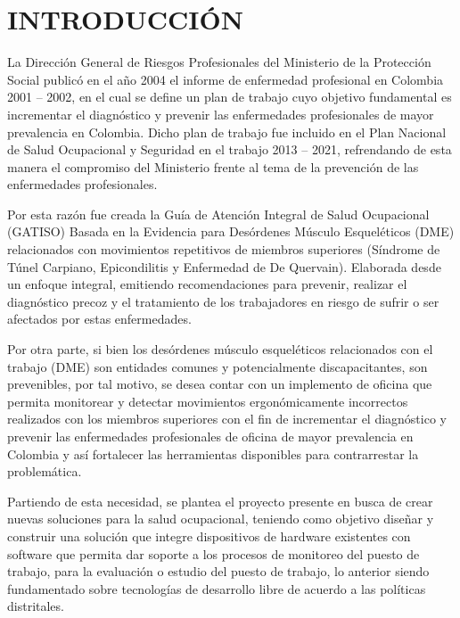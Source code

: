 \newpage
\chapter{INTRODUCCIÓN} 
La Dirección General de Riesgos Profesionales del Ministerio de la Protección Social publicó en el año 2004 el informe de enfermedad profesional en Colombia 2001 – 2002, en el cual se define un plan de trabajo cuyo objetivo fundamental es incrementar el diagnóstico y prevenir las enfermedades profesionales de mayor prevalencia en Colombia. Dicho plan de trabajo fue incluido en el Plan Nacional de Salud Ocupacional y Seguridad en el trabajo 2013 – 2021, refrendando de esta manera el compromiso del Ministerio frente al tema de la prevención de las enfermedades profesionales.

Por esta razón fue creada la Guía de Atención Integral de Salud Ocupacional (GATISO) Basada en la Evidencia para Desórdenes Músculo Esqueléticos (DME) relacionados con movimientos repetitivos de miembros superiores (Síndrome de Túnel Carpiano, Epicondilitis y Enfermedad de De Quervain). Elaborada desde un enfoque integral, emitiendo recomendaciones para prevenir, realizar el diagnóstico precoz y el tratamiento de los trabajadores en riesgo de sufrir o ser afectados por estas enfermedades.

Por otra parte, si bien los desórdenes músculo esqueléticos relacionados con el trabajo (DME) son entidades comunes y potencialmente discapacitantes, son prevenibles, por tal motivo, se desea contar con un implemento de oficina que permita monitorear y detectar movimientos ergonómicamente incorrectos realizados con los miembros superiores con el fin de incrementar el diagnóstico y prevenir las enfermedades profesionales de oficina de mayor prevalencia en Colombia y así fortalecer las herramientas disponibles para contrarrestar la problemática.

Partiendo de esta necesidad, se plantea el proyecto presente en busca de crear nuevas soluciones para la salud ocupacional, teniendo como objetivo diseñar y construir una solución que integre dispositivos de hardware existentes con software que permita dar soporte a los procesos de monitoreo del puesto de trabajo, para la evaluación o estudio del puesto de trabajo, lo anterior siendo fundamentado sobre tecnologías de desarrollo libre de acuerdo a las políticas distritales.